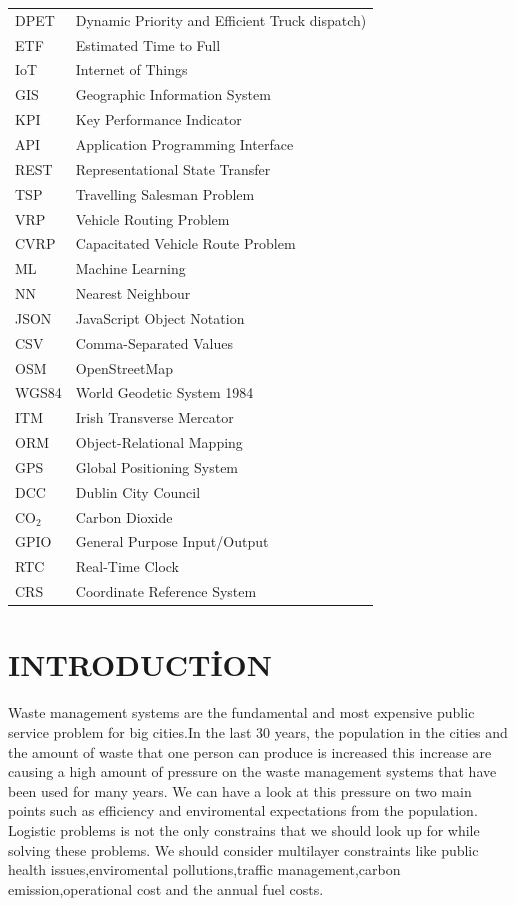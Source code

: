 \documentclass[12pt,a4paper]{report}
\begin{document}
\begin{tabular}{ll}
DPET  &  Dynamic Priority and Efficient Truck dispatch) \\
ETF   &  Estimated Time to Full \\
IoT   & Internet of Things \\
GIS   & Geographic Information System \\
KPI  & Key Performance Indicator \\
API   & Application Programming Interface \\
REST  & Representational State Transfer \\
TSP   &  Travelling Salesman Problem \\
VRP   & Vehicle Routing Problem \\
CVRP  & Capacitated Vehicle Route Problem  \\
ML    & Machine Learning \\
NN    & Nearest Neighbour \\
JSON  & JavaScript Object Notation \\
CSV   & Comma-Separated Values \\
OSM   & OpenStreetMap \\
WGS84 & World Geodetic System 1984 \\
ITM   & Irish Transverse Mercator \\
ORM   & Object-Relational Mapping \\
GPS   & Global Positioning System \\
DCC   & Dublin City Council \\
CO$_2$ & Carbon Dioxide \\
GPIO  & General Purpose Input/Output \\
RTC   & Real-Time Clock \\
CRS   & Coordinate Reference System \\
\end{tabular}

\clearpage

\setcounter{page}{1}

\chapter{INTRODUCTİON}
\indent Waste management systems are the fundamental and most expensive public service problem for big cities.In the last 30 years, the population in the cities and the amount of  waste that one person can produce is increased this increase are causing a high amount of pressure on the waste management systems that have been used for many years. We can have a look at this pressure on two main points such as efficiency and enviromental expectations from the population.
Logistic problems is not the only constrains that we should look up for while solving these problems. We should consider multilayer constraints like public health issues,enviromental pollutions,traffic management,carbon emission,operational cost  and the annual fuel costs.
\end{document}
